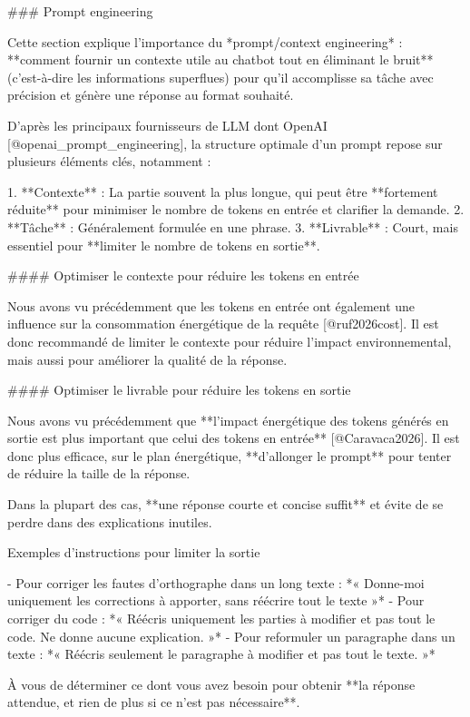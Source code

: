 ### Prompt engineering

Cette section explique l'importance du *prompt/context engineering* : **comment fournir un contexte utile au chatbot tout en éliminant le bruit** (c'est-à-dire les informations superflues) pour qu'il accomplisse sa tâche avec précision et génère une réponse au format souhaité.

D'après les principaux fournisseurs de LLM dont OpenAI [@openai_prompt_engineering], la structure optimale d'un prompt repose sur plusieurs éléments clés, notamment :

1. **Contexte** : La partie souvent la plus longue, qui peut être **fortement réduite** pour minimiser le nombre de tokens en entrée et clarifier la demande.
2. **Tâche** : Généralement formulée en une phrase.
3. **Livrable** : Court, mais essentiel pour **limiter le nombre de tokens en sortie**.

#### Optimiser le contexte pour réduire les tokens en entrée

Nous avons vu précédemment que les tokens en entrée ont également une influence sur la consommation énergétique de la requête [@ruf2026cost]. Il est donc recommandé de limiter le contexte pour réduire l'impact environnemental, mais aussi pour améliorer la qualité de la réponse.

#### Optimiser le livrable pour réduire les tokens en sortie

Nous avons vu précédemment que **l'impact énergétique des tokens générés en sortie est plus important que celui des tokens en entrée** [@Caravaca2026]. Il est donc plus efficace, sur le plan énergétique, **d'allonger le prompt** pour tenter de réduire la taille de la réponse.

Dans la plupart des cas, **une réponse courte et concise suffit** et évite de se perdre dans des explications inutiles.

Exemples d'instructions pour limiter la sortie

- Pour corriger les fautes d'orthographe dans un long texte :
  *« Donne-moi uniquement les corrections à apporter, sans réécrire tout le texte »*
- Pour corriger du code :
  *« Réécris uniquement les parties à modifier et pas tout le code. Ne donne aucune explication. »*
- Pour reformuler un paragraphe dans un texte :
  *« Réécris seulement le paragraphe à modifier et pas tout le texte. »*

À vous de déterminer ce dont vous avez besoin pour obtenir **la réponse attendue, et rien de plus si ce n'est pas nécessaire**.


